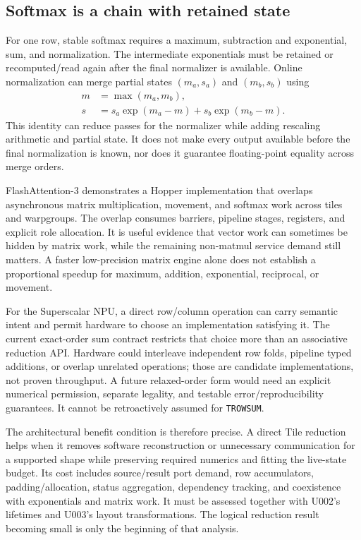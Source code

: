 \subsection{Softmax is a chain with retained state}

For one row, stable softmax requires a maximum, subtraction and exponential, sum, and normalization. The intermediate exponentials must be retained or recomputed/read again after the final normalizer is available. Online normalization can merge partial states $(m_a,s_a)$ and $(m_b,s_b)$ using
\begin{align}
 m &= \max(m_a,m_b),\\
 s &= s_a\exp(m_a-m)+s_b\exp(m_b-m).
\end{align}
This identity can reduce passes for the normalizer while adding rescaling arithmetic and partial state. It does not make every output available before the final normalization is known, nor does it guarantee floating-point equality across merge orders.~\citep{u005-online-softmax}

FlashAttention-3 demonstrates a Hopper implementation that overlaps asynchronous matrix multiplication, movement, and softmax work across tiles and warpgroups. The overlap consumes barriers, pipeline stages, registers, and explicit role allocation. It is useful evidence that vector work can sometimes be hidden by matrix work, while the remaining non-matmul service demand still matters. A faster low-precision matrix engine alone does not establish a proportional speedup for maximum, addition, exponential, reciprocal, or movement.~\citep{u005-flash3}

For the Superscalar NPU, a direct row/column operation can carry semantic intent and permit hardware to choose an implementation satisfying it. The current exact-order sum contract restricts that choice more than an associative reduction API. Hardware could interleave independent row folds, pipeline typed additions, or overlap unrelated operations; those are candidate implementations, not proven throughput. A future relaxed-order form would need an explicit numerical permission, separate legality, and testable error/reproducibility guarantees. It cannot be retroactively assumed for \texttt{TROWSUM}.

The architectural benefit condition is therefore precise. A direct Tile reduction helps when it removes software reconstruction or unnecessary communication for a supported shape while preserving required numerics and fitting the live-state budget. Its cost includes source/result port demand, row accumulators, padding/allocation, status aggregation, dependency tracking, and coexistence with exponentials and matrix work. It must be assessed together with U002's lifetimes and U003's layout transformations. The logical reduction result becoming small is only the beginning of that analysis.

